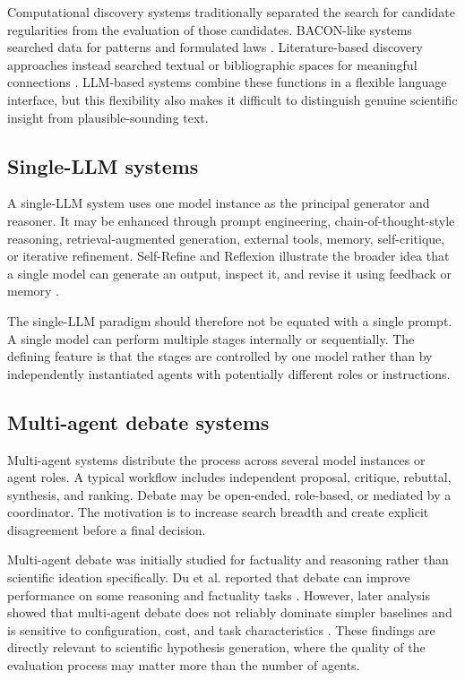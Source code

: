 \documentclass[11pt]{article}
\begin{document}
Computational discovery systems traditionally separated the search for candidate regularities from
the evaluation of those candidates. BACON-like systems searched data for patterns and formulated
laws \cite{langley1987scientific}. Literature-based discovery approaches instead searched textual or
bibliographic spaces for meaningful connections \cite{swanson1986undiscovered}. LLM-based
systems combine these functions in a flexible language interface, but this flexibility also makes it
difficult to distinguish genuine scientific insight from plausible-sounding text.

\subsection{Single-LLM systems}
\label{subsec:single-llm}

A single-LLM system uses one model instance as the principal generator and reasoner. It may be
enhanced through prompt engineering, chain-of-thought-style reasoning, retrieval-augmented
generation, external tools, memory, self-critique, or iterative refinement. Self-Refine and Reflexion
illustrate the broader idea that a single model can generate an output, inspect it, and revise it using
feedback or memory \cite{madaan2023selfrefine,shinn2023reflexion}.

The single-LLM paradigm should therefore not be equated with a single prompt. A single model
can perform multiple stages internally or sequentially. The defining feature is that the stages are
controlled by one model rather than by independently instantiated agents with potentially different
roles or instructions.

\subsection{Multi-agent debate systems}
\label{subsec:multi-agent}

Multi-agent systems distribute the process across several model instances or agent roles. A typical
workflow includes independent proposal, critique, rebuttal, synthesis, and ranking. Debate may be
open-ended, role-based, or mediated by a coordinator. The motivation is to increase search breadth
and create explicit disagreement before a final decision.

Multi-agent debate was initially studied for factuality and reasoning rather than scientific ideation
specifically. Du et al. reported that debate can improve performance on some reasoning and
factuality tasks \cite{du2024improving}. However, later analysis showed that multi-agent debate does
not reliably dominate simpler baselines and is sensitive to configuration, cost, and task
characteristics \cite{smit2024mad}. These findings are directly relevant to scientific hypothesis
generation, where the quality of the evaluation process may matter more than the number of agents.
\end{document}
